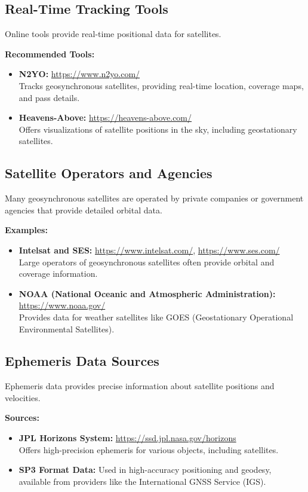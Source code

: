 \subsection{Real-Time Tracking Tools}
Online tools provide real-time positional data for satellites.

\textbf{Recommended Tools:}
\begin{itemize}
    \item \textbf{N2YO:} \href{https://www.n2yo.com/}{https://www.n2yo.com/} \\
    Tracks geosynchronous satellites, providing real-time location, coverage maps, and pass details.
    \item \textbf{Heavens-Above:} \href{https://heavens-above.com/}{https://heavens-above.com/} \\
    Offers visualizations of satellite positions in the sky, including geostationary satellites.
\end{itemize}

\subsection{Satellite Operators and Agencies}
Many geosynchronous satellites are operated by private companies or government agencies that provide detailed orbital data.

\textbf{Examples:}
\begin{itemize}
    \item \textbf{Intelsat and SES:} \href{https://www.intelsat.com/}{https://www.intelsat.com/}, \href{https://www.ses.com/}{https://www.ses.com/} \\
    Large operators of geosynchronous satellites often provide orbital and coverage information.
    \item \textbf{NOAA (National Oceanic and Atmospheric Administration):} \href{https://www.noaa.gov/}{https://www.noaa.gov/} \\
    Provides data for weather satellites like GOES (Geostationary Operational Environmental Satellites).
\end{itemize}

\subsection{Ephemeris Data Sources}
Ephemeris data provides precise information about satellite positions and velocities.

\textbf{Sources:}
\begin{itemize}
    \item \textbf{JPL Horizons System:} \href{https://ssd.jpl.nasa.gov/horizons}{https://ssd.jpl.nasa.gov/horizons} \\
    Offers high-precision ephemeris for various objects, including satellites.
    \item \textbf{SP3 Format Data:} Used in high-accuracy positioning and geodesy, available from providers like the International GNSS Service (IGS).
\end{itemize}

